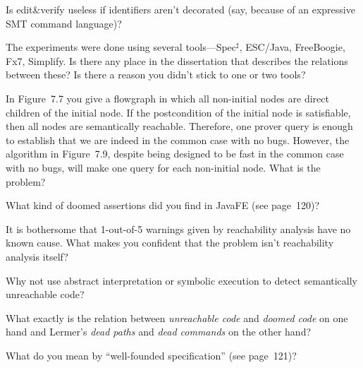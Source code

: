 \Q Is edit\&verify useless if identifiers aren't decorated (say, because of
an expressive SMT command language)?

\Q The experiments were done using several tools---Spec$^\sharp$, ESC/Java,
FreeBoogie, Fx7, Simplify. Is there any place in the dissertation that
describes the relations between these? Is there a reason you didn't stick
to one or two tools?

\Q In Figure~7.7 you give a flowgraph in which all non-initial nodes are
direct children of the initial node. If the postcondition of the initial
node is satisfiable, then all nodes are semantically reachable. Therefore,
one prover query is enough to establish that we are indeed in the common
case with no bugs. However, the algorithm in Figure~7.9, despite being
designed to be fast in the common case with no bugs, will make one query
for each non-initial node. What is the problem?


\Q What kind of doomed assertions did you find in JavaFE (see page~120)?

\Q It is bothersome that 1-out-of-5 warnings given by reachability analysis
have no known cause. What makes you confident that the problem isn't
reachability analysis itself?

\Q Why not use abstract interpretation or symbolic execution to detect
semantically unreachable code?


\Q What exactly is the relation between {\it unreachable code\/} and {\it
doomed code\/} on one hand and Lermer's {\it dead paths\/} and {\it dead
commands\/} on the other hand?

\Q What do you mean by ``well-founded specification'' (see page~121)?

\bye
